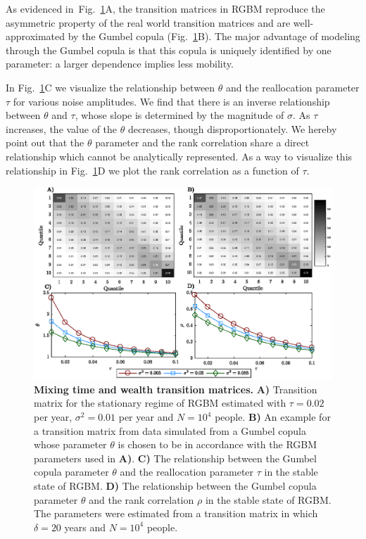 \documentclass[11pt]{article}
\newcommand{\fref}[1]{Fig.~\ref{fig:#1}}
\numberwithin{equation}{section}
\begin{document}
As evidenced in~\fref{rgbm-wealth-matrices}A, the transition matrices in RGBM reproduce the asymmetric property of the real world transition matrices and are well-approximated by the Gumbel copula (\fref{rgbm-wealth-matrices}B). The major advantage of modeling through the Gumbel copula is that this copula is uniquely identified by one parameter: a larger dependence implies less mobility.

In \fref{rgbm-wealth-matrices}C we visualize the relationship between $\theta$ and the reallocation parameter $\tau$ for various noise amplitudes. We find that there is an inverse relationship between $\theta$ and $\tau$, whose slope is determined by the magnitude of $\sigma$. As $\tau$ increases, the value of the $\theta$ decreases, though disproportionately. We hereby point out that the $\theta$ parameter and the rank correlation share a direct relationship which cannot be analytically represented. As a way to visualize this relationship in \fref{rgbm-wealth-matrices}D we plot the rank correlation as a function of $\tau$.

\begin{figure}[!htb]
\centering
\includegraphics[width=1.0\textwidth]{figs/fig_rgbm_gumbel_v2.eps}
\caption{\textbf{Mixing time and wealth transition matrices.} \textbf{A)} Transition matrix for the stationary regime of RGBM estimated with $\tau = 0.02$ per year, $\sigma^2 = 0.01$ per year and $N = 10^4$ people. \textbf{B)} An example for a transition matrix from data simulated from a Gumbel copula whose parameter $\theta$ is chosen to be in accordance with the RGBM parameters used in \textbf{A)}. \textbf{C)} The relationship between the Gumbel copula parameter $\theta$ and the reallocation parameter $\tau$ in the stable state of RGBM. \textbf{D)} The relationship between the Gumbel copula parameter $\theta$ and the rank correlation $\rho$ in the stable state of RGBM. The parameters were estimated from a transition matrix in which $\delta = 20$ years and $N = 10^4$ people.
\label{fig:rgbm-wealth-matrices}}
\end{figure}
\FloatBarrier
\end{document}
